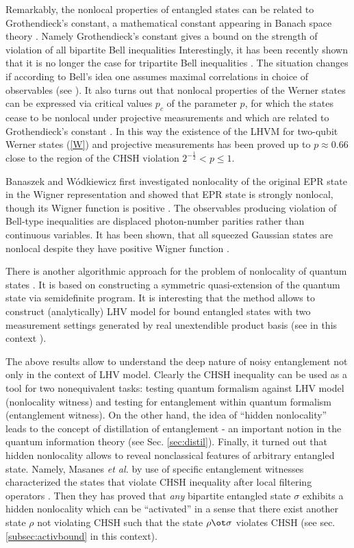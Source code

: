 \documentclass[twocolumn,aps,rmp]{revtex4}
\begin{document}
Remarkably, the nonlocal properties of entangled states can be
related to  Grothendieck's constant, a mathematical constant
appearing in Banach space theory \cite{Grothendieck_const}.
Namely Grothendieck's constant gives a bound on the strength of violation
of all bipartite Bell inequalities \cite{Tsirelson,AcinGT2006-grot}
Interestingly, it has been recently shown that it is no longer the case for
tripartite Bell inequalities \cite{GraziaWVJ_unbound_violBell_2007}. The situation
changes if according to Bell's idea one assumes maximal correlations in choice
of observables (see \cite{Pitowsky2007}).
It also turns out that nonlocal properties of the Werner states can be expressed
via critical values $p_c$ of the parameter $p$, for which the states
cease to be nonlocal under projective measurements and which are
related to Grothendieck's constant \cite {AcinGT2006-grot}. In this way the
existence of the LHVM for two-qubit Werner states (\ref{W}) and
projective measurements has been proved up to $p\approx 0.66$ close
to the region of the CHSH violation $2^{-\frac{1}{2}} < p \leq 1$.

Banaszek and W\'{o}dkiewicz first investigated nonlocality of the
original EPR state in the Wigner representation and showed that EPR
state is strongly nonlocal, though its Wigner function is positive
\cite {BanaszekW}. The observables producing violation of Bell-type
inequalities are displaced photon-number parities rather than
continuous variables. It has been shown, that all squeezed Gaussian
states are nonlocal despite they have positive Wigner function
\cite{LoockB2001}.

There is another algorithmic approach for the problem of nonlocality
of quantum states \cite {TerhalDS}. It is based on constructing a
symmetric quasi-extension of the quantum state via semidefinite
program. It is interesting that the method allows to construct
(analytically) LHV model for bound entangled states with two measurement
settings generated by real unextendible product basis (see in this
context \cite {KaszlikowskiZG}).


The above results allow to understand the deep nature of noisy
entanglement not only in the context of LHV model. Clearly the CHSH
inequality can be used as a tool for two nonequivalent tasks: testing
quantum formalism against LHV model (nonlocality witness) and testing for entanglement within
quantum formalism (entanglement witness). On the other hand, the idea of ``hidden
nonlocality'' leads to the concept of distillation of entanglement -
an important notion in the quantum information theory (see
Sec. \ref{sec:distil}). Finally, it turned out that hidden nonlocality
allows to reveal nonclassical  features of arbitrary entangled  state.
Namely,  Masanes {\it et al.} by use of specific entanglement witnesses characterized the states that violate CHSH inequality after local filtering operators \cite{MasanesLD2007}. Then they has proved that {\it any} bipartite entangled state $\sigma$  exhibits a hidden nonlocality which can be ``activated'' in a sense that there exist another state $\rho$ not violating CHSH such that the state $\rho \ot \sigma$ violates CHSH (see sec. \ref{subsec:activbound} in this context).
\end{document}
